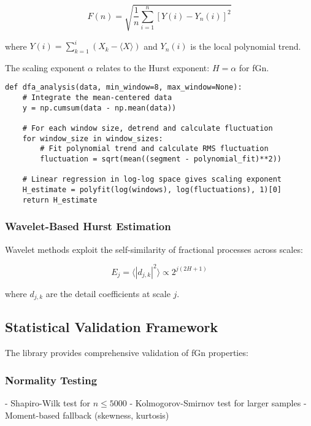 \documentclass[11pt,a4paper]{article}
\begin{document}
\begin{equation}
F(n) = \sqrt{\frac{1}{n} \sum_{i=1}^{n} [Y(i) - Y_n(i)]^2}
\end{equation}

where $Y(i) = \sum_{k=1}^{i} (X_k - \langle X \rangle)$ and $Y_n(i)$ is the local polynomial trend.

The scaling exponent $\alpha$ relates to the Hurst exponent: $H = \alpha$ for fGn.

\begin{lstlisting}
def dfa_analysis(data, min_window=8, max_window=None):
    # Integrate the mean-centered data
    y = np.cumsum(data - np.mean(data))
    
    # For each window size, detrend and calculate fluctuation
    for window_size in window_sizes:
        # Fit polynomial trend and calculate RMS fluctuation
        fluctuation = sqrt(mean((segment - polynomial_fit)**2))
    
    # Linear regression in log-log space gives scaling exponent
    H_estimate = polyfit(log(windows), log(fluctuations), 1)[0]
    return H_estimate
\end{lstlisting}

\subsubsection{Wavelet-Based Hurst Estimation}

Wavelet methods exploit the self-similarity of fractional processes across scales:

\begin{equation}
E_j = \langle |d_{j,k}|^2 \rangle \propto 2^{j(2H+1)}
\end{equation}

where $d_{j,k}$ are the detail coefficients at scale $j$.

\subsection{Statistical Validation Framework}

The library provides comprehensive validation of fGn properties:

\subsubsection{Normality Testing}
- Shapiro-Wilk test for $n \leq 5000$
- Kolmogorov-Smirnov test for larger samples
- Moment-based fallback (skewness, kurtosis)
\end{document}
